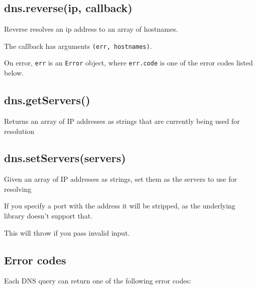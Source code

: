 \subsection{dns.reverse(ip, callback)}\label{dns.reverseip-callback}

Reverse resolves an ip address to an array of hostnames.

The callback has arguments \texttt{(err, hostnames)}.

On error, \texttt{err} is an \texttt{Error} object, where
\texttt{err.code} is one of the error codes listed below.

\subsection{dns.getServers()}\label{dns.getservers}

Returns an array of IP addresses as strings that are currently being
used for resolution

\subsection{dns.setServers(servers)}\label{dns.setserversservers}

Given an array of IP addresses as strings, set them as the servers to
use for resolving

If you specify a port with the address it will be stripped, as the
underlying library doesn't support that.

This will throw if you pass invalid input.

\subsection{Error codes}\label{error-codes}

Each DNS query can return one of the following error codes:

